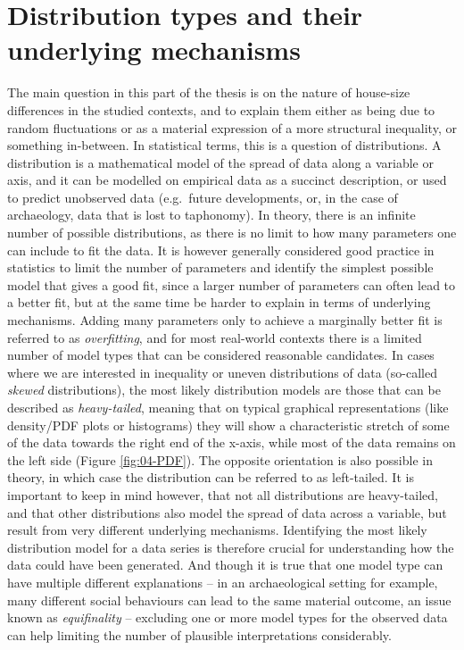 \documentclass[
  12pt,
  a4paper, twoside]{book}
\begin{document}
\hypertarget{distributions}{%
\section{Distribution types and their underlying mechanisms}\label{distributions}}

The main question in this part of the thesis is on the nature of house-size differences in the studied contexts, and to explain them either as being due to random fluctuations or as a material expression of a more structural inequality, or something in-between. In statistical terms, this is a question of distributions. A distribution is a mathematical model of the spread of data along a variable or axis, and it can be modelled on empirical data as a succinct description, or used to predict unobserved data (e.g.~future developments, or, in the case of archaeology, data that is lost to taphonomy). In theory, there is an infinite number of possible distributions, as there is no limit to how many parameters one can include to fit the data. It is however generally considered good practice in statistics to limit the number of parameters and identify the simplest possible model that gives a good fit, since a larger number of parameters can often lead to a better fit, but at the same time be harder to explain in terms of underlying mechanisms. Adding many parameters only to achieve a marginally better fit is referred to as \emph{overfitting}, and for most real-world contexts there is a limited number of model types that can be considered reasonable candidates. In cases where we are interested in inequality or uneven distributions of data (so-called \emph{skewed} distributions), the most likely distribution models are those that can be described as \emph{heavy-tailed}, meaning that on typical graphical representations (like density/PDF plots or histograms) they will show a characteristic stretch of some of the data towards the right end of the x-axis, while most of the data remains on the left side (Figure \ref{fig:04-PDF}). The opposite orientation is also possible in theory, in which case the distribution can be referred to as left-tailed. It is important to keep in mind however, that not all distributions are heavy-tailed, and that other distributions also model the spread of data across a variable, but result from very different underlying mechanisms. Identifying the most likely distribution model for a data series is therefore crucial for understanding how the data could have been generated. And though it is true that one model type can have multiple different explanations -- in an archaeological setting for example, many different social behaviours can lead to the same material outcome, an issue known as \emph{equifinality} -- excluding one or more model types for the observed data can help limiting the number of plausible interpretations considerably.
\end{document}

